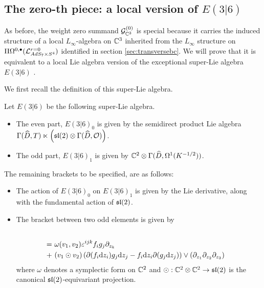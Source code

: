 \subsection{The zero-th piece: a local version of $E(3|6)$}

As before, the weight zero summand $\mathcal{G}_{\mathbb{C}^3} ^{(0)}$ is special because it carries the induced structure of a local $L_\infty$-algebra on ${\mathbb{C}^3} $ inherited from the $L_\infty$ structure on $\Pi\Omega^{0,\bullet} (\mathcal{L}^{r = 0}_{AdS_7\times S^4} )$ identified in section \ref{sec:transversebc}. We will prove that it is equivalent to a local Lie algebra version of the exceptional super-Lie algebra $E(3|6)$ \cite{KacBible}.

We first recall the definition of this super-Lie algebra. 

\begin{defn}\label{defn:e(3|6)}
Let $E(3|6)$ be the following super-Lie algebra.
\begin{itemize}
\item The even part, $E(3|6)_0$ is given by the semidirect product Lie algebra $\Gamma(\widehat D, T) \ltimes \left ( \mathfrak{sl}(2) \otimes \Gamma (\widehat D, \mathcal{O}) \right )$. 
\item The odd part, $E(3|6)_1$ is given by $\mathbb{C}^2\otimes \Gamma (\widehat D, \Omega^1(K^{-1/2} ))$. 
\end{itemize}
The remaining brackets to be specified, are as follows:
\begin{itemize}
\item The action of $E(3|6)_0$ on $E(3|6)_1$ is given by the Lie derivative, along with the fundamental action of $\mathfrak{sl}(2)$. 
\item The bracket between two odd elements is given by 
\begin{align*}
[v_1\otimes f_i \d z_i \otimes (\del_{z_1}\del_{z_2}\del_{z_3})^{1/2} &, v_2\otimes g_j \d z_j \otimes (\del_{z_1}\del_{z_2}\del_{z_3})^{1/2} ]  \\ 
 = & \  \omega (v_1, v_2) \eps^{ijk} f_i g_j \del_{z_k}  \\
 + & \  (v_1 \odot v_2) \left ( \del (f_i \d z_i ) g_j \d z_j  - f_i \d z_i \del (g_j \d z_j)  \right )\vee (\del_{z_1}\del_{z_2}\del_{z_3} )
\end{align*}
where $\omega$ denotes a symplectic form on $\mathbb{C}^2$ and $\odot: \mathbb{C}^2\otimes \mathbb{C}^2 \to \mathfrak{sl}(2)$ is the canonical $\mathfrak{sl}(2)$-equivariant projection. 
\end{itemize}
\end{defn}

